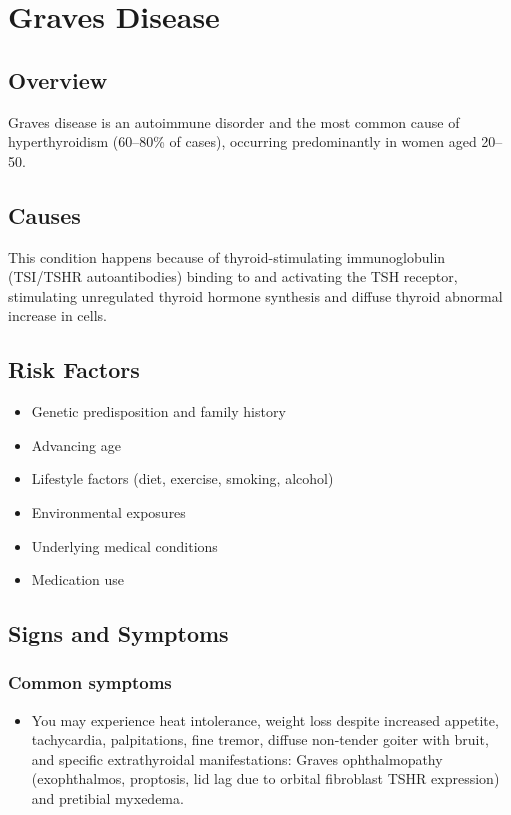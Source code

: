 \chapter{Graves Disease}
\label{sec:Graves Disease}

\section{Overview}
Graves disease is an autoimmune disorder and the most common cause of hyperthyroidism (60--80\% of cases), occurring predominantly in women aged 20--50.
\section{Causes}
This condition happens because of thyroid-stimulating immunoglobulin (TSI/TSHR autoantibodies) binding to and activating the TSH receptor, stimulating unregulated thyroid hormone synthesis and diffuse thyroid abnormal increase in cells.     
\section{Risk Factors}

\begin{itemize}[noitemsep]
  \item Genetic predisposition and family history
  \item Advancing age
  \item Lifestyle factors (diet, exercise, smoking, alcohol)
  \item Environmental exposures
  \item Underlying medical conditions
  \item Medication use
\end{itemize}
\section{Signs and Symptoms}

\subsection{Common symptoms}
\begin{itemize}[noitemsep]
  \item You may experience heat intolerance, weight loss despite increased appetite, tachycardia, palpitations, fine tremor, diffuse non-tender goiter with bruit, and specific extrathyroidal manifestations: Graves ophthalmopathy (exophthalmos, proptosis, lid lag due to orbital fibroblast TSHR expression) and pretibial myxedema. 
  \end{itemize}

